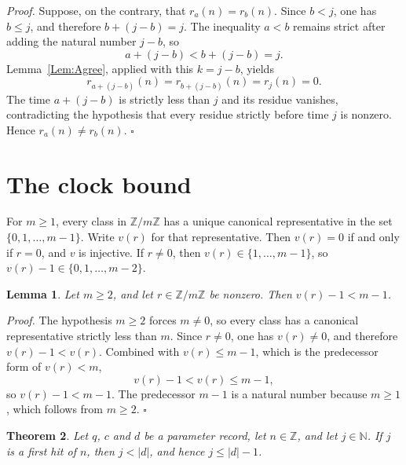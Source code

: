 \documentclass[11pt,letterpaper]{article}
\newcommand{\N}{\mathbb{N}}
\newcommand{\Z}{\mathbb{Z}}
\newtheorem{theorem}{Theorem}
\newtheorem{lemma}[theorem]{Lemma}
\newenvironment{proof}{\noindent\textit{Proof.}}{\hfill\(\square\)}
\begin{document}
\begin{proof}
Suppose, on the contrary, that \(r_{a}(n)=r_{b}(n)\). Since \(b<j\), one has \(b\le j\), and therefore \(b+(j-b)=j\). The inequality \(a<b\) remains strict after adding the natural number \(j-b\), so
\[
a+(j-b)<b+(j-b)=j.
\]
Lemma~\ref{Lem:Agree}, applied with this \(k=j-b\), yields
\[
r_{a+(j-b)}(n)=r_{b+(j-b)}(n)=r_{j}(n)=0.
\]
The time \(a+(j-b)\) is strictly less than \(j\) and its residue vanishes, contradicting the hypothesis that every residue strictly before time \(j\) is nonzero. Hence \(r_{a}(n)\neq r_{b}(n)\).
\end{proof}

\section{The clock bound}

For \(m\ge 1\), every class in \(\Z/m\Z\) has a unique canonical representative in the set \(\{0,1,\ldots,m-1\}\). Write \(v(r)\) for that representative. Then \(v(r)=0\) if and only if \(r=0\), and \(v\) is injective. If \(r\neq 0\), then \(v(r)\in\{1,\ldots,m-1\}\), so \(v(r)-1\in\{0,1,\ldots,m-2\}\).

\begin{lemma}
\label{Lem:IndexBound}
Let \(m\ge 2\), and let \(r\in\Z/m\Z\) be nonzero. Then \(v(r)-1<m-1\).
\end{lemma}

\begin{proof}
The hypothesis \(m\ge 2\) forces \(m\neq 0\), so every class has a canonical representative strictly less than \(m\). Since \(r\neq 0\), one has \(v(r)\neq 0\), and therefore \(v(r)-1<v(r)\). Combined with \(v(r)\le m-1\), which is the predecessor form of \(v(r)<m\),
\[
v(r)-1<v(r)\le m-1,
\]
so \(v(r)-1<m-1\). The predecessor \(m-1\) is a natural number because \(m\ge 1\), which follows from \(m\ge 2\).
\end{proof}

\begin{theorem}
\label{Thm:Clock}
Let \(q\), \(c\) and \(d\) be a parameter record, let \(n\in\Z\), and let \(j\in\N\). If \(j\) is a first hit of \(n\), then \(j<|d|\), and hence \(j\le |d|-1\).
\end{theorem}
\end{document}

